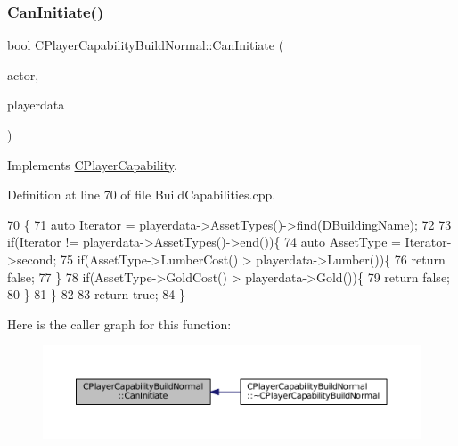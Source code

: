 \subsubsection{\texorpdfstring{Can\+Initiate()}{CanInitiate()}}
{\footnotesize\ttfamily bool C\+Player\+Capability\+Build\+Normal\+::\+Can\+Initiate (\begin{DoxyParamCaption}\item[{std\+::shared\+\_\+ptr$<$ \hyperlink{classCPlayerAsset}{C\+Player\+Asset} $>$}]{actor,  }\item[{std\+::shared\+\_\+ptr$<$ \hyperlink{classCPlayerData}{C\+Player\+Data} $>$}]{playerdata }\end{DoxyParamCaption})\hspace{0.3cm}{\ttfamily [virtual]}}



Implements \hyperlink{classCPlayerCapability_aa83b1e1fcaff2985c378132d679154ea}{C\+Player\+Capability}.



Definition at line 70 of file Build\+Capabilities.\+cpp.


\begin{DoxyCode}
70                                                                                                            
                     \{
71     \textcolor{keyword}{auto} Iterator = playerdata->AssetTypes()->find(\hyperlink{classCPlayerCapabilityBuildNormal_aae09d6cee5f8e201a0139c9065a5577c}{DBuildingName});
72     
73     \textcolor{keywordflow}{if}(Iterator != playerdata->AssetTypes()->end())\{
74         \textcolor{keyword}{auto} AssetType = Iterator->second;
75         \textcolor{keywordflow}{if}(AssetType->LumberCost() > playerdata->Lumber())\{
76             \textcolor{keywordflow}{return} \textcolor{keyword}{false};   
77         \}
78         \textcolor{keywordflow}{if}(AssetType->GoldCost() > playerdata->Gold())\{
79             \textcolor{keywordflow}{return} \textcolor{keyword}{false};   
80         \}
81     \}
82     
83     \textcolor{keywordflow}{return} \textcolor{keyword}{true};
84 \}
\end{DoxyCode}
Here is the caller graph for this function\+:
\nopagebreak
\begin{figure}[H]
\begin{center}
\leavevmode
\includegraphics[width=350pt]{classCPlayerCapabilityBuildNormal_a5487e5521779846198604e8ebadaf283_icgraph}
\end{center}
\end{figure}


